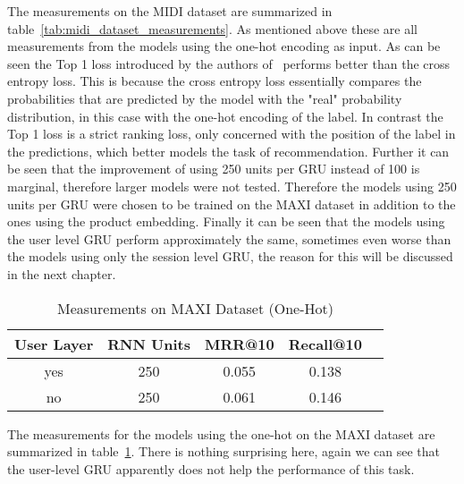 The measurements on the MIDI dataset are summarized in table~\ref{tab:midi_dataset_measurements}.
As mentioned above these are all measurements from the models using the one-hot encoding as input.
As can be seen the Top 1 loss introduced by the authors of~\cite{gru4rec} performs better than the cross entropy loss.
This is because the cross entropy loss essentially compares the probabilities that are predicted by the model with the "real" probability distribution, in this case with the one-hot encoding of the label.
In contrast the Top 1 loss is a strict ranking loss, only concerned with the position of the label in the predictions, which better models the task of recommendation.
Further it can be seen that the improvement of using 250 units per GRU instead of 100 is marginal, therefore larger models were not tested.
Therefore the models using 250 units per GRU were chosen to be trained on the MAXI dataset in addition to the ones using the product embedding.
Finally it can be seen that the models using the user level GRU perform approximately the same, sometimes even worse than the models using only the session level GRU, the reason for this will be discussed in the next chapter.
\begin{table}[t]
    \centering
    \begin{tabular}{|c|c|c|c|c|}
        \hline
        User Layer & RNN Units & MRR@10 & Recall@10 \\ \hline
        yes & 250 & 0.055 & 0.138 \\ \hline
        no & 250 & 0.061 & 0.146 \\ \hline
    \end{tabular}
    \caption{Measurements on MAXI Dataset (One-Hot)}
    \label{tab:maxi_dataset_measurements_one_hot}
\end{table}
The measurements for the models using the one-hot on the MAXI dataset are summarized in table~\ref{tab:maxi_dataset_measurements_one_hot}.
There is nothing surprising here, again we can see that the user-level GRU apparently does not help the performance of this task.

